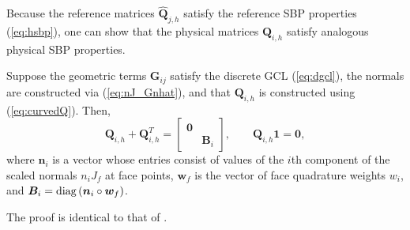 \documentclass{svjour3}                     %
\renewcommand{\hat}{\widehat}
\newcommand{\diag}[1]{{\rm diag}\LRp{#1}}
\newcommand{\LRp}[1]{\left( #1 \right)}
\newcommand{\LRs}[1]{\left[ #1 \right]}
\renewcommand{\note}[1]{{\color{blue}{#1}}}
\begin{document}
Because the reference matrices $\hat{\bm{Q}}_{j,h}$ satisfy the reference SBP properties (\ref{eq:hsbp}), one can show \cite{chan2018discretely} that the physical matrices $\bm{Q}_{i,h}$ satisfy analogous physical SBP properties.  
\begin{lemma}
\label{lemma:Qhprops}
Suppose the geometric terms $\bm{G}_{ij}$ satisfy the discrete GCL (\ref{eq:dgcl}), the normals are constructed via (\ref{eq:nJ_Gnhat}), and that $\bm{Q}_{i,h}$ is constructed using (\ref{eq:curvedQ}).  Then, %
\[
\bm{Q}_{i,h} + \bm{Q}_{i,h}^T = \begin{bmatrix}
\bm{0} &\\
& \bm{B}_i \end{bmatrix}, \qquad \bm{Q}_{i,h}\bm{1} = \bm{0},
\]
where $\bm{n}_i$ is a vector whose entries consist of values of the $i$th component of the scaled normals $n_iJ_f$ at face points, $\bm{w}_f$ is the vector of face quadrature weights $w_i$, and $\bm{B}_i = \diag{\bm{n}_i \circ \bm{w}_f}$.
\end{lemma}
The proof is identical to that of \cite{chan2018discretely}.  
%
\end{document}

